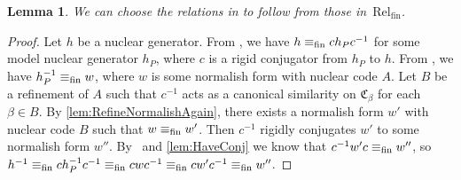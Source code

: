 \documentclass[11pt,letterpaper]{amsart}
\newtheorem{lemma}[theorem]{Lemma}
\theoremstyle{definition}
\newcommand{\Rel}{\mathrm{Rel}}
\newcommand{\C}{\mathfrak{C}}
\begin{document}
\begin{lemma}\label{lem:HaveInv}
We can choose the relations in\/ {\normalfont\Inv} to follow from those in\/~$\Rel_{\mathrm{fin}}$.
\end{lemma}
\begin{proof}
Let $h$ be a nuclear generator.  From \Model, we have $h\equiv_{\mathrm{fin}} ch_Pc^{-1}$ for some model nuclear generator $h_P$, where $c$ is a rigid conjugator from $h_P$ to $h$. From \InvFin, we have $h_P^{-1}\equiv_{\mathrm{fin}} w$, where $w$ is some normalish form with nuclear code $A$.  Let $B$ be a refinement of $A$ such that $c^{-1}$ acts as a canonical similarity on $\C_\beta$ for each $\beta\in B$. By \cref{lem:RefineNormalishAgain}, there exists a normalish form $w'$ with nuclear code $B$ such that $w\equiv_{\mathrm{fin}} w'$.  Then $c^{-1}$ rigidly conjugates $w'$ to some normalish form $w''$.  By \Conj\ and \cref{lem:HaveConj} we know that $c^{-1}w'c\equiv_{\mathrm{fin}} w''$, so $h^{-1}\equiv_{\mathrm{fin}} ch_P^{-1}c^{-1} \equiv_{\mathrm{fin}} cwc^{-1} \equiv_{\mathrm{fin}} cw'c^{-1} \equiv_{\mathrm{fin}} w''$.
\end{proof}
\end{document}
